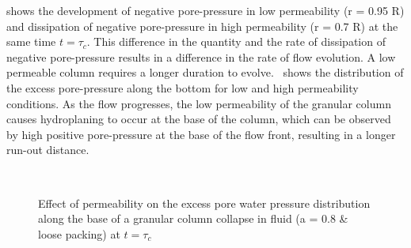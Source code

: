  shows the development of negative pore-pressure in low 
permeability (r = 0.95 R) and dissipation of negative pore-pressure in high 
permeability (r = 0.7 R) at the same time $ t = \tau_c$. This difference in the 
quantity and the rate of dissipation of negative pore-pressure results in 
a difference in the rate of flow evolution. A low permeable column requires a 
longer duration to evolve.~ shows the distribution of 
the excess pore-pressure along the bottom for low and high permeability 
conditions. As the flow progresses, the low permeability of 
the granular column causes hydroplaning to occur at the base of the column, 
which can be observed by high positive pore-pressure at the base of the flow 
front, resulting in a longer run-out distance.
\begin{figure}
\centering
{}\\
\caption{Effect of permeability on the excess pore water pressure distribution 
along the base of a granular column collapse in fluid (a = 0.8 \& loose 
packing) at $t = 
\tau_c$}
\label{fig:Loose_PWP_ini}
\end{figure}

